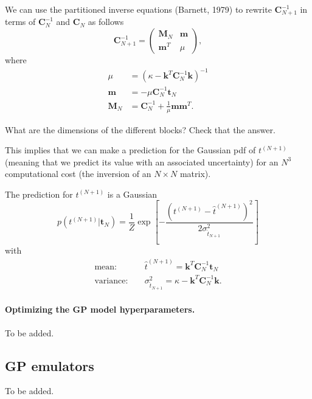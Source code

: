 \documentclass[%
oneside,                 %
final,                   %
10pt]{article}
\newenvironment{summary_mdfboxadmon}[1][]{
\begin{summary_mdfboxmdframed}[frametitle=#1]
}
{
\end{summary_mdfboxmdframed}
}
\newenvironment{question_mdfboxadmon}[1][]{
\begin{question_mdfboxmdframed}[frametitle=#1]
}
{
\end{question_mdfboxmdframed}
}
\begin{document}
We can use the partitioned inverse equations (Barnett, 1979) to rewrite $\boldsymbol{C}_{N+1}^{-1}$ in terms of $\boldsymbol{C}_{N}^{-1}$ and $\boldsymbol{C}_{N}$ as follows
\[
\boldsymbol{C}_{N+1}^{-1} =
\begin{pmatrix}
\boldsymbol{M}_N & \boldsymbol{m} \\
\boldsymbol{m}^T & \mu
\end{pmatrix},
\]
where
\begin{align*}
\mu &= \left( \kappa - \boldsymbol{k}^T \boldsymbol{C}_N^{-1} \boldsymbol{k} \right)^{-1} \\
\boldsymbol{m} &= -\mu \boldsymbol{C}_N^{-1} \boldsymbol{t}_N \\
\boldsymbol{M}_N &= \boldsymbol{C}_N^{-1} + \frac{1}{\mu} \boldsymbol{m} \boldsymbol{m}^T.
\end{align*}


\begin{question_mdfboxadmon}[Question]
What are the dimensions of the different blocks? Check that the answer.
\end{question_mdfboxadmon} %



This implies that we can make a prediction for the Gaussian pdf of $t^{(N+1)}$ (meaning that we predict its value with an associated uncertainty) for an $N^3$ computational cost (the inversion of an $N \times N$ matrix).


\begin{summary_mdfboxadmon}[Summary]
The prediction for $t^{(N+1)}$ is a Gaussian
\[
p \left( t^{(N+1)} | \boldsymbol{t}_N \right) = \frac{1}{Z} \exp
\left[
-\frac{\left( t^{(N+1)} - \hat{t}^{(N+1)} \right)^2}{2 \sigma_{\hat{t}_{N+1}}^2}
\right]
\]
with
\begin{align*}
\mathrm{mean:} & \quad \hat{t}^{(N+1)} = \boldsymbol{k}^T \boldsymbol{C}_N^{-1} \boldsymbol{t}_N \\
\mathrm{variance:} & \quad \sigma_{\hat{t}_{N+1}}^2 = \kappa - \boldsymbol{k}^T \boldsymbol{C}_N^{-1} \boldsymbol{k}.
\end{align*}
\end{summary_mdfboxadmon} %




\paragraph{Optimizing the GP model hyperparameters.}
To be added.

\subsection{GP emulators}

To be added.


\end{document}
